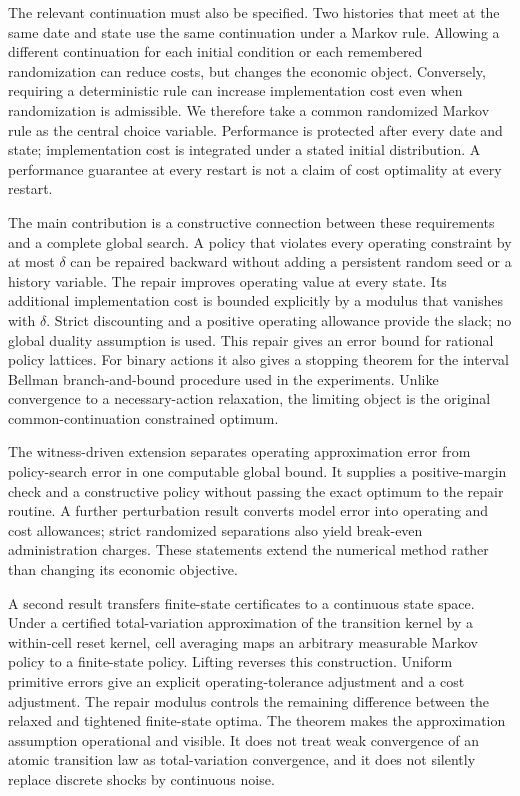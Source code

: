 The relevant continuation must also be specified. Two histories that meet at the same date and state use the same continuation under a Markov rule. Allowing a different continuation for each initial condition or each remembered randomization can reduce costs, but changes the economic object. Conversely, requiring a deterministic rule can increase implementation cost even when randomization is admissible. We therefore take a common randomized Markov rule as the central choice variable. Performance is protected after every date and state; implementation cost is integrated under a stated initial distribution. A performance guarantee at every restart is not a claim of cost optimality at every restart.

The main contribution is a constructive connection between these requirements and a complete global search. A policy that violates every operating constraint by at most $\delta$ can be repaired backward without adding a persistent random seed or a history variable. The repair improves operating value at every state. Its additional implementation cost is bounded explicitly by a modulus that vanishes with $\delta$. Strict discounting and a positive operating allowance provide the slack; no global duality assumption is used. This repair gives an error bound for rational policy lattices. For binary actions it also gives a stopping theorem for the interval Bellman branch-and-bound procedure used in the experiments. Unlike convergence to a necessary-action relaxation, the limiting object is the original common-continuation constrained optimum.

The witness-driven extension separates operating approximation error from policy-search error in one computable global bound. It supplies a positive-margin check and a constructive policy without passing the exact optimum to the repair routine. A further perturbation result converts model error into operating and cost allowances; strict randomized separations also yield break-even administration charges. These statements extend the numerical method rather than changing its economic objective.

A second result transfers finite-state certificates to a continuous state space. Under a certified total-variation approximation of the transition kernel by a within-cell reset kernel, cell averaging maps an arbitrary measurable Markov policy to a finite-state policy. Lifting reverses this construction. Uniform primitive errors give an explicit operating-tolerance adjustment and a cost adjustment. The repair modulus controls the remaining difference between the relaxed and tightened finite-state optima. The theorem makes the approximation assumption operational and visible. It does not treat weak convergence of an atomic transition law as total-variation convergence, and it does not silently replace discrete shocks by continuous noise.

